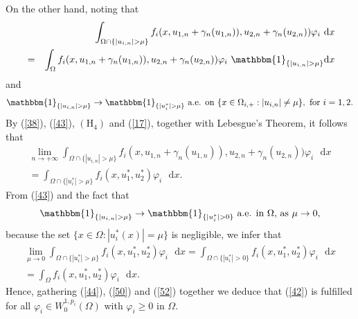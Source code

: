 \documentclass[11pt]{amsart}
\theoremstyle{definition}
\theoremstyle{remark}
\numberwithin{equation}{section}
\begin{document}
On the other hand, noting that 
\begin{eqnarray*}
&&\int_{\Omega \cap \{|u_{i,n}|>\mu \}}f_{i}(x,u_{1,n}+\gamma
_{n}(u_{1,n})),u_{2,n}+\gamma _{n}(u_{2,n}))\varphi _{i}\text{ }\mathrm{d}x
\\
&=&\int_{\Omega }f_{i}(x,u_{1,n}+\gamma _{n}(u_{1,n})),u_{2,n}+\gamma
_{n}(u_{2,n}))\varphi _{i}\text{ }\mathbbm{1}_{\{|u_{i,n}|>\mu \}}\mathrm{d}x
\end{eqnarray*}%
and 
\begin{equation*}
\mathbbm{1}_{\{|u_{i,n}|>\mu \}}\rightarrow \mathbbm{1}_{\{|u_{i}^{\ast
}|>\mu \}}\text{ a.e. on }\{x\in \Omega _{i,+}:|u_{i,n}|\neq \mu \},\text{
for }i=1,2.
\end{equation*}%
By (\ref{38}), (\ref{43}), $(\mathrm{H}_{4})$ and (\ref{17}), together with
Lebesgue's Theorem, it follows that%
\begin{equation}
\begin{array}{l}
\lim_{n\rightarrow +\infty }\int_{\Omega \cap \{|u_{i,n}|>\mu
\}}f_{i}(x,u_{1,n}+\gamma _{n}(u_{1,n})),u_{2,n}+\gamma
_{n}(u_{2,n}))\varphi _{i}\text{ }\mathrm{d}x \\ 
=\int_{\Omega \cap \{|u_{i}^{\ast }|>\mu \}}f_{i}(x,u_{1}^{\ast
},u_{2}^{\ast })\varphi _{i}\text{ }\mathrm{d}x.%
\end{array}
\label{51}
\end{equation}%
From (\ref{43}) and the fact that%
\begin{equation*}
\mathbbm{1}_{\{|u_{i,n}|>\mu \}}\rightarrow \mathbbm{1}_{\{|u_{i}^{\ast
}|>0\}}\text{ a.e. in }\Omega \text{, as }\mu \rightarrow 0,
\end{equation*}%
because the set $\{x\in \Omega :|u_{i}^{\ast }(x)|=\mu \}$ is negligible, we
infer that%
\begin{equation}
\begin{array}{c}
\lim_{\mu \rightarrow 0}\int_{\Omega \cap \{|u_{i}^{\ast }|>\mu
\}}f_{i}(x,u_{1}^{\ast },u_{2}^{\ast })\varphi _{i}\text{ }\mathrm{d}%
x=\int_{\Omega \cap \{|u_{i}^{\ast }|>0\}}f_{i}(x,u_{1}^{\ast },u_{2}^{\ast
})\varphi _{i}\text{ }\mathrm{d}x \\ 
=\int_{\Omega }f_{i}(x,u_{1}^{\ast },u_{2}^{\ast })\varphi _{i}\text{ }%
\mathrm{d}x.%
\end{array}
\label{52}
\end{equation}%
Hence, gathering (\ref{44}), (\ref{50}) and (\ref{52}) together we deduce
that (\ref{42}) is fulfilled for all $\varphi _{i}\in W_{0}^{1,p_{i}}(\Omega
)$ with $\varphi _{i}\geq 0$ in $\Omega $.
\end{document}
